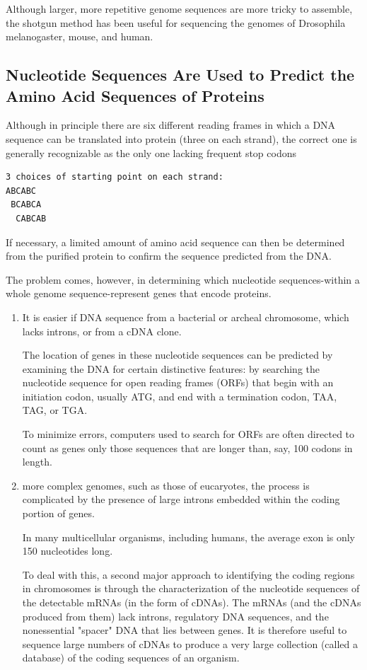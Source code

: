 Although larger, more repetitive genome sequences are more tricky to assemble,
the shotgun method has been useful for sequencing the genomes of Drosophila
melanogaster, mouse, and human.


\subsection{Nucleotide Sequences Are Used to Predict the Amino Acid Sequences of Proteins}

Although in principle there are six different reading frames in which a DNA
sequence can be translated into protein (three on each strand), the correct one
is generally recognizable as the only one lacking frequent stop codons
\begin{verbatim}
3 choices of starting point on each strand:
ABCABC
 BCABCA
  CABCAB
\end{verbatim}

If necessary, a limited amount of amino acid sequence can then be determined
from the purified protein to confirm the sequence predicted from the DNA.

The problem comes, however, in determining which nucleotide sequences-within a
whole genome sequence-represent genes that encode proteins. 
\begin{enumerate}
  \item  It is easier if DNA sequence from a bacterial or archeal chromosome,
  which lacks introns, or from a cDNA clone.
  
  The location of genes in these nucleotide sequences can be predicted by
  examining the DNA for certain distinctive features:
  by searching the nucleotide sequence for open reading frames (ORFs) that begin
  with an initiation codon, usually ATG, and end with a termination codon, TAA,
  TAG, or TGA.
  
  To minimize errors, computers used to search for ORFs are often directed to
  count as genes only those sequences that are longer than, say, 100 codons in
  length. 
  
  
  \item   more complex genomes, such as those of eucaryotes, the process is
  complicated by the presence of large introns embedded within the coding
  portion of genes. 
  
  In many multicellular organisms, including humans, the average exon is only
  150 nucleotides long.
  
  To deal with this, a second major approach to identifying the coding regions
  in chromosomes is through the characterization of the nucleotide sequences of
  the detectable mRNAs (in the form of cDNAs). The mRNAs (and the cDNAs produced
  from them) lack introns, regulatory DNA sequences, and the nonessential
  "spacer" DNA that lies between genes. It is therefore useful to sequence large
  numbers of cDNAs to produce a very large collection (called a database) of the
  coding sequences of an organism.
\end{enumerate}

